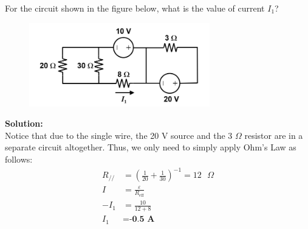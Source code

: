 \documentclass[a4paper, 12pt, addpoints]{exam}
\begin{document}
\begin{questions}

\question For the circuit shown in the figure below, what is the value of current $I_1$?
\begin{figure}[h!]
    \centering
    \includegraphics[width=0.7\textwidth]{images/Q6.png}
\end{figure}

\begin{tcolorbox}
    \textbf{Solution:} \\
    Notice that due to the single wire, the 20 V source and the 3 $\Omega$ resistor are in a separate circuit altogether.
    Thus, we only need to simply apply Ohm's Law as follows:
    \begin{align*}
        R_{//} &= (\frac{1}{20} + \frac{1}{30})^{-1} = 12\text{ }\Omega \\
        I &= \frac{\varepsilon}{R_\text{eff}} \\
        -I_1 &= \frac{10}{12+8} \\
        I_1 &= \textbf{-0.5 A}
    \end{align*}
\end{tcolorbox}


\end{questions}
\end{document}
